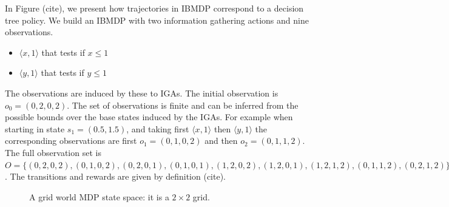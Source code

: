 In Figure (cite), we present how trajectories in IBMDP correspond to a decision tree policy.
We build an IBMDP with two information gathering actions and nine observations.
\begin{itemize}
    \item $\langle x, 1\rangle$ that tests if $x\leq 1$
    \item $\langle y, 1\rangle$ that tests if $y\leq 1$
\end{itemize}
The observations are induced by these to IGAs. The initial observation is $o_0=(0, 2, 0, 2)$.
The set of observations is finite and can be inferred from the possible bounds over the base states induced by the IGAs.
For example when starting in state $s_1 = (0.5, 1.5)$, and taking first $\langle x, 1\rangle$ then $\langle y, 1\rangle$ the corresponding observations are first $o_1 = (0, 1, 0, 2)$ and then $o_2 = (0, 1, 1, 2)$.
The full observation set is $O = \{(0, 2, 0, 2), (0, 1, 0, 2), (0, 2, 0, 1), (0, 1, 0, 1), (1, 2, 0, 2), (1, 2, 0, 1), (1, 2, 1, 2), (0, 1, 1, 2), (0, 2, 1, 2)\}$.
The transitions and rewards are given by definition (cite).
\begin{figure}[h]
\centering
{}
\caption{A grid world MDP state space: it is a $2\times2$ grid.}
\end{figure}

